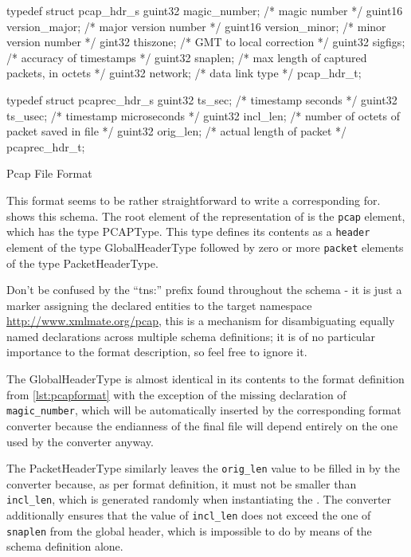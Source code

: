 \begin{listing}[H]
\centering
\begin{cppcode}
typedef struct pcap_hdr_s {
        guint32 magic_number;   /* magic number */
        guint16 version_major;  /* major version number */
        guint16 version_minor;  /* minor version number */
        gint32  thiszone;       /* GMT to local correction */
        guint32 sigfigs;        /* accuracy of timestamps */
        guint32 snaplen;        /* max length of captured packets, in octets */
        guint32 network;        /* data link type */
} pcap_hdr_t;

typedef struct pcaprec_hdr_s {
        guint32 ts_sec;         /* timestamp seconds */
        guint32 ts_usec;        /* timestamp microseconds */
        guint32 incl_len;       /* number of octets of packet saved in file */
        guint32 orig_len;       /* actual length of packet */
} pcaprec_hdr_t;
\end{cppcode}
\caption{Pcap File Format}
\label{lst:pcapformat}
\end{listing}

This format seems to be rather straightforward to write a corresponding \xsd for.  shows
this schema. The root element of the \xml representation of \pcap is the \texttt{pcap} element, which has the
type PCAPType. This type defines its contents as a \texttt{header} element of the type GlobalHeaderType
followed by zero or more \texttt{packet} elements of the type PacketHeaderType. 

Don't be confused by the ``tns:'' prefix found throughout the schema - it is just a marker assigning the
declared entities to the target namespace \url{http://www.xmlmate.org/pcap}, this is a mechanism for
disambiguating equally named declarations across multiple schema definitions; it is of no particular
importance to the format description, so feel free to ignore it. 

The GlobalHeaderType is almost identical in its contents to the format definition from \cref{lst:pcapformat}
with the exception of the missing declaration of \texttt{magic\_number}, which will be automatically inserted
by the corresponding format converter because the endianness of the final \pcap file will depend entirely on
the one used by the converter anyway.

The PacketHeaderType similarly leaves the \texttt{orig\_len} value to be filled in by the converter because, as
per format definition, it must not be smaller than \texttt{incl\_len}, which is generated randomly when
instantiating the \xml. The converter additionally ensures that the value of \texttt{incl\_len} does not exceed
the one of \texttt{snaplen} from the global header, which is impossible to do by means of the schema
definition alone.

